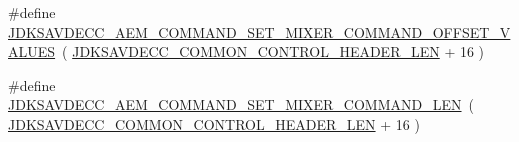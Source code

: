 \begin{DoxyCompactItemize}
\item 
\#define \hyperlink{group__command__set__mixer_gad834d592e327865d1f92e0dcda4ccbd1}{J\+D\+K\+S\+A\+V\+D\+E\+C\+C\+\_\+\+A\+E\+M\+\_\+\+C\+O\+M\+M\+A\+N\+D\+\_\+\+S\+E\+T\+\_\+\+M\+I\+X\+E\+R\+\_\+\+C\+O\+M\+M\+A\+N\+D\+\_\+\+O\+F\+F\+S\+E\+T\+\_\+\+V\+A\+L\+U\+ES}~( \hyperlink{group__jdksavdecc__avtp__common__control__header_gaae84052886fb1bb42f3bc5f85b741dff}{J\+D\+K\+S\+A\+V\+D\+E\+C\+C\+\_\+\+C\+O\+M\+M\+O\+N\+\_\+\+C\+O\+N\+T\+R\+O\+L\+\_\+\+H\+E\+A\+D\+E\+R\+\_\+\+L\+EN} + 16 )
\item 
\#define \hyperlink{group__command__set__mixer_ga99895088fc524d7953bca73a5d1f4bf9}{J\+D\+K\+S\+A\+V\+D\+E\+C\+C\+\_\+\+A\+E\+M\+\_\+\+C\+O\+M\+M\+A\+N\+D\+\_\+\+S\+E\+T\+\_\+\+M\+I\+X\+E\+R\+\_\+\+C\+O\+M\+M\+A\+N\+D\+\_\+\+L\+EN}~( \hyperlink{group__jdksavdecc__avtp__common__control__header_gaae84052886fb1bb42f3bc5f85b741dff}{J\+D\+K\+S\+A\+V\+D\+E\+C\+C\+\_\+\+C\+O\+M\+M\+O\+N\+\_\+\+C\+O\+N\+T\+R\+O\+L\+\_\+\+H\+E\+A\+D\+E\+R\+\_\+\+L\+EN} + 16 )
\end{DoxyCompactItemize}
